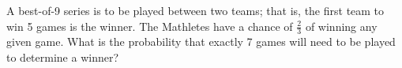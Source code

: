 A best-of-9 series is to be played between two teams; that is, the first team to win 5 games is the winner. The Mathletes have a chance of $\tfrac{2}{3}$ of winning any given game. What is the probability that exactly 7 games will need to be played to determine a winner?